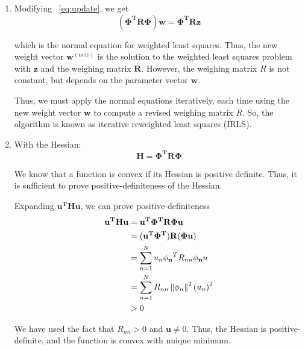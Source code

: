 \documentclass[reqno]{amsart}
\begin{document}
\begin{enumerate}[label=\textbf{(\Roman*)}]
        \item 
        
        Modifying ~\eqref{eq:update}, we get 
        \[(\mathbf{\Phi^T R \Phi}) \mathbf{w} = \mathbf{\Phi^T R z}\]

        which is the normal equation for weighted least squares. Thus, the new weight vector \(\mathbf{w}^{(new)}\) is the solution to the weighted least squares problem with \(\mathbf{z}\) and the weighing matrix \(\mathbf{R}\). However, the weighing matrix \(R\) is not constant, but depends on the parameter vector \(\mathbf{w}\).
        
        Thus, we must apply the normal equations iteratively, each time using the new weight vector \(\mathbf{w}\) to compute a revised weighing matrix \(R\). So, the algorithm is known as iterative reweighted least squares (IRLS).
        
        \item 
        With the Hessian: \[\mathbf{H} = \mathbf{\Phi^T R \Phi}\]

        We know that a function is convex if its Hessian is positive definite. Thus, it is sufficient to prove positive-definiteness of the Hessian.

        Expanding \( \mathbf{u^T H u} \), we can prove positive-definiteness \begin{align}
            \begin{split}
                \mathbf{u^T H u} &= \mathbf{u^T \Phi^T R \Phi u} \\
                &= (\mathbf{u^T \Phi^T}) \mathbf{R} (\mathbf{\Phi u}) \\
                &= \sum_{n = 1}^{N} u_n \mathbf{\phi_n}^T R_{nn} \mathbf{\phi_n} u \\
                &= \sum_{n = 1}^{N} R_{nn} \left\lVert\phi_n\right\rVert^2 \left(u_n\right)^2 \\
                &> 0
            \end{split}
        \end{align}

        We have used the fact that \(R_{nn} > 0\) and \(\mathbf{u} \neq 0\). Thus, the Hessian is positive-definite, and the function is convex with unique minimum.


    \end{enumerate}
\end{document}
